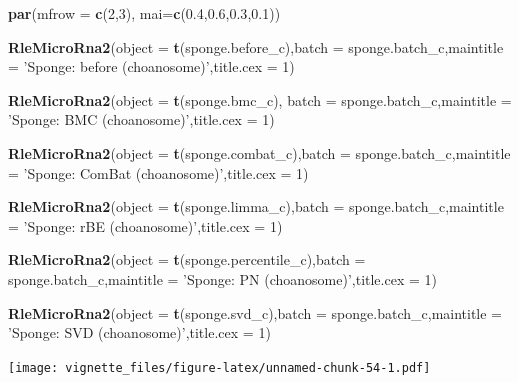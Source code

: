\documentclass[]{book}
\newenvironment{Shaded}{\begin{snugshade}}{\end{snugshade}}
\newcommand{\KeywordTok}[1]{\textcolor[rgb]{0.13,0.29,0.53}{\textbf{#1}}}
\newcommand{\DataTypeTok}[1]{\textcolor[rgb]{0.13,0.29,0.53}{#1}}
\newcommand{\DecValTok}[1]{\textcolor[rgb]{0.00,0.00,0.81}{#1}}
\newcommand{\FloatTok}[1]{\textcolor[rgb]{0.00,0.00,0.81}{#1}}
\newcommand{\StringTok}[1]{\textcolor[rgb]{0.31,0.60,0.02}{#1}}
\newcommand{\NormalTok}[1]{#1}
\begin{document}
\begin{Shaded}
\begin{Highlighting}[]
\KeywordTok{par}\NormalTok{(}\DataTypeTok{mfrow =} \KeywordTok{c}\NormalTok{(}\DecValTok{2}\NormalTok{,}\DecValTok{3}\NormalTok{), }\DataTypeTok{mai=}\KeywordTok{c}\NormalTok{(}\FloatTok{0.4}\NormalTok{,}\FloatTok{0.6}\NormalTok{,}\FloatTok{0.3}\NormalTok{,}\FloatTok{0.1}\NormalTok{))}

\KeywordTok{RleMicroRna2}\NormalTok{(}\DataTypeTok{object =} \KeywordTok{t}\NormalTok{(sponge.before_c),}\DataTypeTok{batch =}\NormalTok{ sponge.batch_c,}\DataTypeTok{maintitle =} \StringTok{'Sponge: before (choanosome)'}\NormalTok{,}\DataTypeTok{title.cex =} \DecValTok{1}\NormalTok{)}

\KeywordTok{RleMicroRna2}\NormalTok{(}\DataTypeTok{object =} \KeywordTok{t}\NormalTok{(sponge.bmc_c), }\DataTypeTok{batch =}\NormalTok{ sponge.batch_c,}\DataTypeTok{maintitle =} \StringTok{'Sponge: BMC (choanosome)'}\NormalTok{,}\DataTypeTok{title.cex =} \DecValTok{1}\NormalTok{)}

\KeywordTok{RleMicroRna2}\NormalTok{(}\DataTypeTok{object =} \KeywordTok{t}\NormalTok{(sponge.combat_c),}\DataTypeTok{batch =}\NormalTok{ sponge.batch_c,}\DataTypeTok{maintitle =} \StringTok{'Sponge: ComBat (choanosome)'}\NormalTok{,}\DataTypeTok{title.cex =} \DecValTok{1}\NormalTok{)}

\KeywordTok{RleMicroRna2}\NormalTok{(}\DataTypeTok{object =} \KeywordTok{t}\NormalTok{(sponge.limma_c),}\DataTypeTok{batch =}\NormalTok{ sponge.batch_c,}\DataTypeTok{maintitle =} \StringTok{'Sponge: rBE (choanosome)'}\NormalTok{,}\DataTypeTok{title.cex =} \DecValTok{1}\NormalTok{)}

\KeywordTok{RleMicroRna2}\NormalTok{(}\DataTypeTok{object =} \KeywordTok{t}\NormalTok{(sponge.percentile_c),}\DataTypeTok{batch =}\NormalTok{ sponge.batch_c,}\DataTypeTok{maintitle =} \StringTok{'Sponge: PN (choanosome)'}\NormalTok{,}\DataTypeTok{title.cex =} \DecValTok{1}\NormalTok{)}

\KeywordTok{RleMicroRna2}\NormalTok{(}\DataTypeTok{object =} \KeywordTok{t}\NormalTok{(sponge.svd_c),}\DataTypeTok{batch =}\NormalTok{ sponge.batch_c,}\DataTypeTok{maintitle =} \StringTok{'Sponge: SVD (choanosome)'}\NormalTok{,}\DataTypeTok{title.cex =} \DecValTok{1}\NormalTok{)}
\end{Highlighting}
\end{Shaded}

\texttt{[image: vignette\_files/figure-latex/unnamed-chunk-54-1.pdf]}
\end{document}
